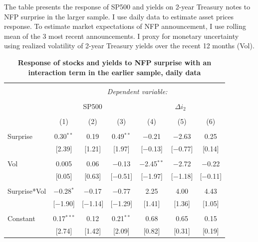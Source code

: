 \documentclass[12pt]{article}
\begin{document}

\begin{table}[!htbp] \centering 
  \caption{\textbf{Response of stocks and yields to NFP surprise with an interaction term in the earlier sample, daily data}} 
  \label{} 
      \begin{flushleft}
    {\medskip\small
 The table presents the response of SP500 and yields on 2-year Treasury notes to NFP surprise in the larger sample. I use daily data to estimate asset prices response. To estimate market expectations of NFP announcement, I use rolling mean of the 3 most recent announcements. I proxy for monetary uncertainty using realized volatility of 2-year Treasury yields over the recent 12 months (Vol).}
    \medskip
    \end{flushleft}
\begin{tabular}{@{\extracolsep{1pt}}lcccccc} 
\\[-1.8ex]\hline 
\hline \\[-1.8ex] 
 & \multicolumn{6}{c}{\textit{Dependent variable:}} \\ 
\cline{2-7} 
\\[-1.8ex] & \multicolumn{3}{c}{SP500} & \multicolumn{3}{c}{$\Delta i_2$} \\ 
\\[-1.8ex] & (1) & (2) & (3) & (4) & (5) & (6)\\ 
\hline \\[-1.8ex] 
 Surprise & 0.30$^{**}$ & 0.19 & 0.49$^{**}$ & $-$0.21 & $-$2.63 & 0.25 \\ 
  & [2.39] & [1.21] & [1.97] & [$-$0.13] & [$-$0.77] & [0.14] \\ 
  & & & & & & \\ 
 Vol & 0.005 & 0.06 & $-$0.13 & $-$2.45$^{**}$ & $-$2.72 & $-$0.22 \\ 
  & [0.05] & [0.63] & [$-$0.51] & [$-$1.97] & [$-$1.18] & [$-$0.11] \\ 
  & & & & & & \\ 
 Surprise*Vol & $-$0.28$^{*}$ & $-$0.17 & $-$0.77 & 2.25 & 4.00 & 4.43 \\ 
  & [$-$1.90] & [$-$1.14] & [$-$1.29] & [1.41] & [1.36] & [1.05] \\ 
  & & & & & & \\ 
 Constant & 0.17$^{***}$ & 0.12 & 0.21$^{**}$ & 0.68 & 0.65 & 0.15 \\ 
  & [2.74] & [1.42] & [2.09] & [0.82] & [0.31] & [0.19] \\ 

\end{tabular}
\end{table}
\end{document}
